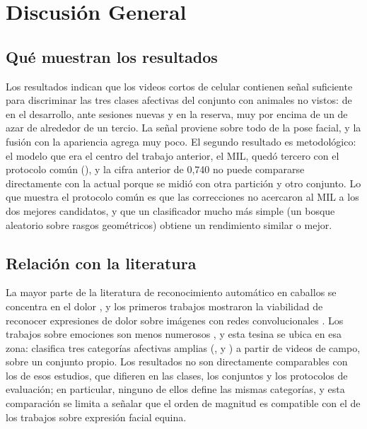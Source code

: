 \section{Discusión General}
\subsection{Qué muestran los resultados}
Los resultados indican que los videos cortos de celular contienen señal suficiente para discriminar las tres clases afectivas del conjunto con animales no vistos: \FusionDevF{} de \fmacro{} en el desarrollo, \FusionSesionF{} ante sesiones nuevas y \FusionReservaF{} en la reserva, muy por encima de un \fmacro{} de azar de alrededor de un tercio. La señal proviene sobre todo de la pose facial, y la fusión con la apariencia agrega muy poco. El segundo resultado es metodológico: el modelo que era el centro del trabajo anterior, el MIL, quedó tercero con el protocolo común (\MILDevF{}), y la cifra anterior de 0,740 no puede compararse directamente con la actual porque se midió con otra partición y otro conjunto. Lo que muestra el protocolo común es que las correcciones no acercaron al MIL a los dos mejores candidatos, y que un clasificador mucho más simple (un bosque aleatorio sobre rasgos geométricos) obtiene un rendimiento similar o mejor.

\subsection{Relación con la literatura}
La mayor parte de la literatura de reconocimiento automático en caballos se concentra en el dolor \parencite{broome2023}, y los primeros trabajos mostraron la viabilidad de reconocer expresiones de dolor sobre imágenes con redes convolucionales \parencite{lencioni2021,hummel2020,pessanha2023}. Los trabajos sobre emociones son menos numerosos \parencite{corujo2021,feighelstein2024}, y esta tesina se ubica en esa zona: clasifica tres categorías afectivas amplias (,  y ) a partir de videos de campo, sobre un conjunto propio. Los resultados no son directamente comparables con los de esos estudios, que difieren en las clases, los conjuntos y los protocolos de evaluación; en particular, ninguno de ellos define las mismas categorías, y esta comparación se limita a señalar que el orden de magnitud es compatible con el de los trabajos sobre expresión facial equina.

